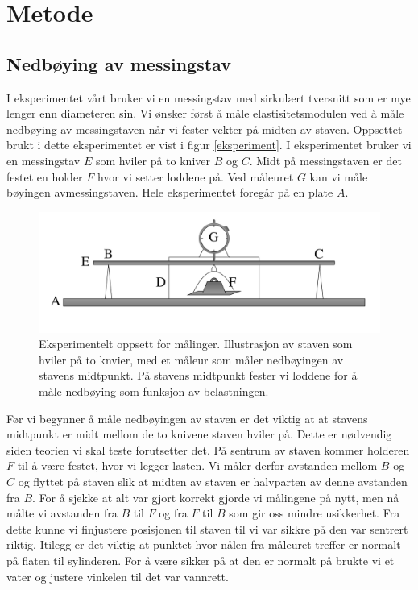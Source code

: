 \documentclass[%
 reprint,
 amsmath,amssymb,
 aps,
 norsk,
 booktabs
]{revtex4-1}
\begin{document}
\section{Metode}
\subsection{Nedbøying av messingstav}
I eksperimentet vårt bruker vi en messingstav med sirkulært tversnitt som er mye lenger enn diameteren sin. Vi ønsker først å måle elastisitetsmodulen ved å måle nedbøying av messingstaven når vi fester vekter på midten av staven. Oppsettet brukt i dette eksperimentet er vist i figur \vref{eksperiment}. I eksperimentet bruker vi en messingstav $E$ som hviler på to kniver $B$ og $C$. Midt på messingstaven er det festet en holder $F$ hvor vi setter loddene på. Ved måleuret $G$ kan vi måle bøyingen avmessingstaven. Hele eksperimentet foregår på en plate $A$.\\
\begin{figure}
  \centering
  \includegraphics[scale=0.17]{oppsett.png}
  \caption{Eksperimentelt oppsett for målinger. Illustrasjon av staven som hviler på to knvier, med et måleur som måler nedbøyingen av stavens midtpunkt. På stavens midtpunkt fester vi loddene for å måle nedbøying som funksjon av belastningen.}
  \label{eksperiment}
\end{figure}
Før vi begynner å måle nedbøyingen av staven er det viktig at at stavens midtpunkt er midt mellom de to knivene staven hviler på. Dette er nødvendig siden teorien vi skal teste forutsetter det. På sentrum av staven kommer holderen $F$ til å være festet, hvor vi legger lasten. Vi måler derfor avstanden mellom $B$ og $C$ og flyttet på staven slik at midten av staven er halvparten av denne avstanden fra $B$. For å sjekke at alt var gjort korrekt gjorde vi målingene på nytt, men nå målte vi avstanden fra $B$ til $F$ og fra $F$ til $B$ som gir oss mindre usikkerhet. Fra dette kunne vi finjustere posisjonen til staven til vi var sikkre på den var sentrert riktig. Itilegg er det viktig at punktet hvor nålen fra måleuret treffer er normalt på flaten til sylinderen. For å være sikker på at den er normalt på brukte vi et vater og justere vinkelen til det var vannrett.\\
\end{document}
